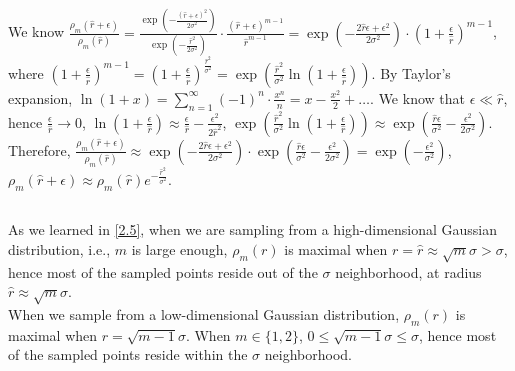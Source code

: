 \documentclass{article}
\begin{document}
        \subsection{}
        We know $\frac{\rho_m(\hat{r}+\epsilon)}{\rho_m(\hat{r})}
        =\frac{\exp(-\frac{(\hat{r}+\epsilon)^2}{2\sigma^2})}{\exp(-\frac{\hat{r}^2}{2\sigma^2})}\cdot\frac{(\hat{r}+\epsilon)^{m-1}}{\hat{r}^{m-1}}
        =\exp(-\frac{2\hat{r}\epsilon+\epsilon^2}{2\sigma^2})\cdot (1+\frac{\epsilon}{\hat{r}})^{m-1}$,
        where $(1+\frac{\epsilon}{\hat{r}})^{m-1}=(1+\frac{\epsilon}{\hat{r}})^{\frac{\hat{r}^2}{\sigma^2}}=\exp(\frac{\hat{r}^2}{\sigma^2}\ln(1+\frac{\epsilon}{\hat{r}}))$. 
        By Taylor's expansion, $\ln(1+x)=\sum_{n=1}^{\infty}(-1)^n\cdot\frac{x^n}{n}= x-\frac{x^2}{2}+\dots$. We know that $\epsilon\ll\hat{r}$, hence $\frac{\epsilon}{\hat{r}}\to 0$, $\ln(1+\frac{\epsilon}{\hat{r}})\approx\frac{\epsilon}{\hat{r}}-\frac{\epsilon^2}{2\hat{r}^2}$,
        $\exp(\frac{\hat{r}^2}{\sigma^2}\ln(1+\frac{\epsilon}{\hat{r}}))\approx\exp(\frac{\hat{r}\epsilon}{\sigma^2}-\frac{\epsilon^2}{2\sigma^2})$. 
        Therefore, $\frac{\rho_m(\hat{r}+\epsilon)}{\rho_m(\hat{r})}\approx\exp(-\frac{2\hat{r}\epsilon+\epsilon^2}{2\sigma^2})\cdot\exp(\frac{\hat{r}\epsilon}{\sigma^2}-\frac{\epsilon^2}{2\sigma^2})=\exp(-\frac{\epsilon^2}{\sigma^2})$,
        $\rho_m(\hat{r}+\epsilon)\approx\rho_m(\hat{r})e^{-\frac{\hat{r}^2}{\sigma^2}}$.

        \subsection{}
        As we learned in \ref{2.5}, when we are sampling from a high-dimensional Gaussian distribution, i.e., $m$ is large enough, 
        $\rho_m(r)$ is maximal when $r=\hat{r}\approx\sqrt{m}\sigma>\sigma$, hence most of the sampled points reside out of the $\sigma$ neighborhood, at radius $\hat{r}\approx\sqrt{m}\sigma$.\\
        When we sample from a low-dimensional Gaussian distribution, $\rho_m(r)$ is maximal when $r=\sqrt{m-1}\sigma$. When $m\in\{1,2\}$, $0\leq\sqrt{m-1}\sigma\leq \sigma$,
        hence most of the sampled points reside within the $\sigma$ neighborhood.
\end{document}

